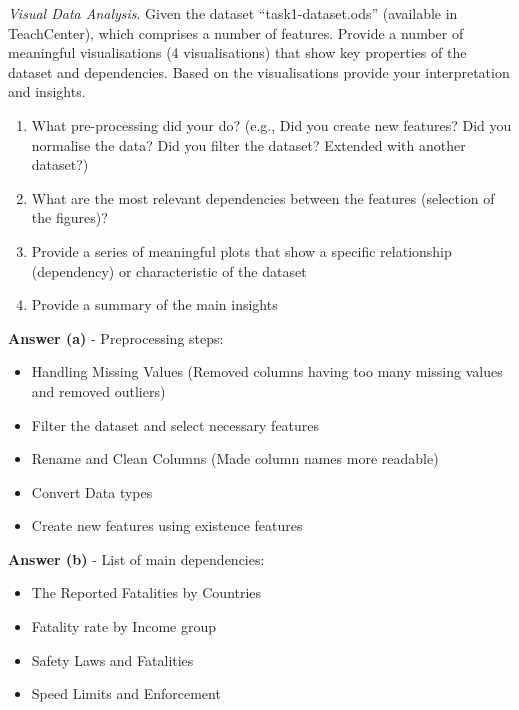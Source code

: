 \documentclass[a4paper,10pt]{article}\setlength{\textheight}{10in}\setlength{\textwidth}{6.5in}\setlength{\topmargin}{-0.125in}\setlength{\oddsidemargin}{-.2in}\setlength{\evensidemargin}{-.2in}\setlength{\headsep}{0.2in}\setlength{\footskip}{0pt}\usepackage{amsmath}\usepackage{fancyhdr}\usepackage{enumitem}\usepackage{hyperref}\usepackage{xcolor}\usepackage{graphicx}\usepackage[export]{adjustbox}\usepackage{caption}\usepackage{float}\usepackage{booktabs}\usepackage{makecell}\pagestyle{fancy}
\begin{document}
\begin{enumerate}[topsep=0mm, partopsep=0mm, leftmargin=*]





{\color{blue}
\item\textit{Visual Data Analysis}. Given the dataset ``task1-dataset.ods'' (available in TeachCenter), which comprises a number of features. Provide a number of meaningful visualisations (4 visualisations) that show key properties of the dataset and dependencies. Based on the visualisations provide your interpretation and insights. 
\begin{enumerate}
	\item What pre-processing did your do? (e.g., Did you create new features? Did you normalise the data? Did you filter the dataset? Extended with another dataset?)
	\item What are the most relevant dependencies between the features (selection of the figures)?
	\item Provide a series of meaningful plots that show a specific relationship (dependency) or characteristic of the dataset
	\item Provide a summary of the main insights
\end{enumerate}
}


\textbf{Answer (a)} - Preprocessing steps:
    \begin{itemize}
        \item Handling Missing Values (Removed columns having too many missing values and removed outliers)
        \item Filter the dataset and select necessary features
        \item Rename and Clean Columns (Made column names more readable)
        \item Convert Data types 
        \item Create new features using existence features
        
    \end{itemize}
    
\textbf{Answer (b)} - List of main dependencies:
    \begin{itemize}
        \item The Reported Fatalities by Countries
        \item Fatality rate by Income group
        \item Safety Laws and Fatalities
        \item Speed Limits and Enforcement
    \end{itemize}
    

\end{enumerate}
\end{document}
